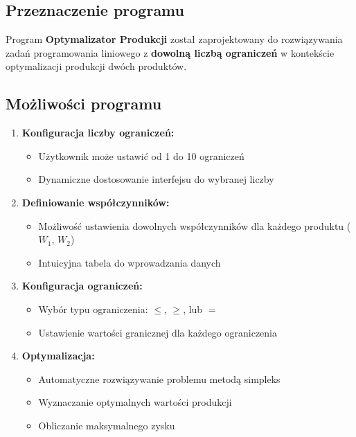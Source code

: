 \documentclass[12pt,a4paper]{article}
\begin{document}
\subsection{Przeznaczenie programu}

Program \textbf{Optymalizator Produkcji} został zaprojektowany do rozwiązywania zadań programowania liniowego z \textbf{dowolną liczbą ograniczeń} w kontekście optymalizacji produkcji dwóch produktów.

\subsection{Możliwości programu}

\begin{enumerate}[label=\textbf{\arabic*.}]
    \item \textbf{Konfiguracja liczby ograniczeń:}
    \begin{itemize}
        \item Użytkownik może ustawić od 1 do 10 ograniczeń
        \item Dynamiczne dostosowanie interfejsu do wybranej liczby
    \end{itemize}
    
    \item \textbf{Definiowanie współczynników:}
    \begin{itemize}
        \item Możliwość ustawienia dowolnych współczynników dla każdego produktu ($W_1$, $W_2$)
        \item Intuicyjna tabela do wprowadzania danych
    \end{itemize}
    
    \item \textbf{Konfiguracja ograniczeń:}
    \begin{itemize}
        \item Wybór typu ograniczenia: $\leq$, $\geq$, lub $=$
        \item Ustawienie wartości granicznej dla każdego ograniczenia
    \end{itemize}
    
    \item \textbf{Optymalizacja:}
    \begin{itemize}
        \item Automatyczne rozwiązywanie problemu metodą simpleks
        \item Wyznaczanie optymalnych wartości produkcji
        \item Obliczanie maksymalnego zysku
    \end{itemize}
    

\end{enumerate}
\end{document}
